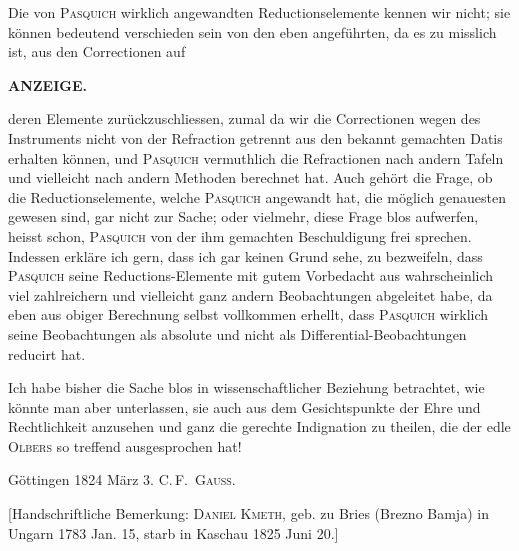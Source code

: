 Die von \textsc{Pasquich} wirklich angewandten Reductionselemente kennen wir nicht; sie können
bedeutend verschieden sein von den eben angeführten, da es zu misslich ist, aus den Correctionen auf\par
{}
\clearpage
\thispagestyle{empty}
\noindent{}%
%
\parbox[t]{\dimexpr\linewidth-24mm\relax}{\centering\footnotesize\bfseries ANZEIGE.\par}%
\makebox[12mm][r]{}\par\medskip
\noindent deren Elemente zurückzuschliessen, zumal da wir die Correctionen wegen des Instruments nicht von der Refraction getrennt aus den bekannt gemachten Datis erhalten können, und \textsc{Pasquich} vermuthlich die Refractionen nach andern Tafeln und vielleicht nach andern Methoden berechnet hat. Auch gehört die Frage, ob die Reductionselemente, welche \textsc{Pasquich} angewandt hat, die möglich genauesten gewesen sind, gar nicht zur Sache; oder vielmehr, diese Frage blos aufwerfen, heisst schon, \textsc{Pasquich} von der ihm gemachten Beschuldigung frei sprechen. Indessen erkläre ich gern, dass ich gar keinen Grund sehe, zu bezweifeln, dass \textsc{Pasquich} seine Reductions-Elemente mit gutem Vorbedacht aus wahrscheinlich viel zahlreichern und vielleicht ganz andern Beobachtungen abgeleitet habe, da eben aus obiger Berechnung selbst vollkommen erhellt, dass \textsc{Pasquich} wirklich seine Beobachtungen als absolute und nicht als Differential-Beobachtungen reducirt hat.

Ich habe bisher die Sache blos in wissenschaftlicher Beziehung betrachtet, wie könnte man aber unterlassen, sie auch aus dem Gesichtspunkte der Ehre und Rechtlichkeit anzusehen und ganz die gerechte Indignation zu theilen, die der edle \textsc{Olbers} so treffend ausgesprochen hat!

\noindent Göttingen 1824 März 3. \hfill C.\,F.\ \textsc{Gauss}.

[Handschriftliche Bemerkung: \textsc{Daniel Kmeth}, geb. zu Bries (Brezno Bamja) in Ungarn 1783 Jan. 15, starb in Kaschau 1825 Juni 20.]

